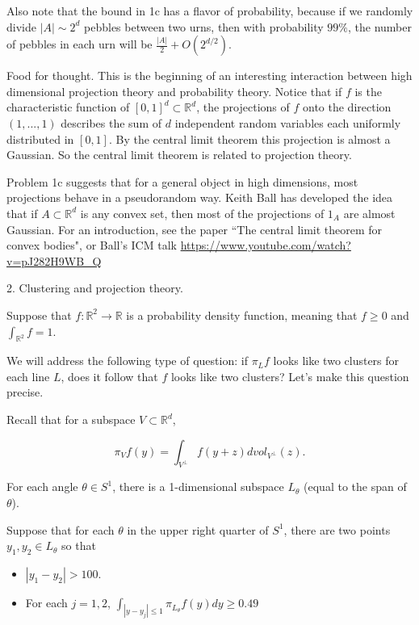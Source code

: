 \documentclass{amsart}
\newcommand{\RR}{\mathbb{R}}
\begin{document}
Also note that the bound in 1c has a flavor of probability,  because if we randomly divide $|A| \sim 2^d$ pebbles between two urns, then with probability $99 \%$,  the number of pebbles in each urn will be $\frac{|A|}{2} + O(2^{d/2})$.

\vskip10pt

Food for thought.  This is the beginning of an interesting interaction between high dimensional projection theory and probability theory.   Notice that if $f$ is the characteristic function of $[0,1]^d \subset \RR^d$,  the projections of $f$ onto the direction $(1,..., 1)$ describes the sum of $d$ independent random variables each uniformly distributed in $[0,1]$.   By the central limit theorem this projection is almost a Gaussian.   So the central limit theorem is related to projection theory. 

Problem 1c suggests that for a general object in high dimensions, most projections behave in a pseudorandom way.    Keith Ball has developed the idea that if $A \subset \RR^d$ is any convex set,  then most of the projections of $1_A$ are almost Gaussian.   For an introduction, see the paper ``The central limit theorem for convex bodies",  or Ball's ICM talk \url{https://www.youtube.com/watch?v=pJ282H9WB_Q}

\vskip10pt

2.  Clustering and projection theory.

Suppose that $f: \RR^2 \rightarrow \RR$ is a probability density function, meaning that $f \ge 0$ and $\int_{\RR^2} f = 1$. 

We will address the following type of question:  if $\pi_L f$ looks like two clusters for each line $L$,  does it follow that $f$ looks like two clusters?  Let's make this question precise.

Recall that for a subspace $V \subset \RR^d$, 

$$ \pi_V f(y) = \int_{V^\perp} f(y + z) dvol_{V^\perp}(z). $$

For each angle $\theta \in S^1$, there is a 1-dimensional subspace $L_\theta$ (equal to the span of $\theta$).  

Suppose that for each $\theta$ in the upper right quarter of $S^1$,  there are two points $y_1, y_2 \in L_\theta$ so that

\begin{itemize}

\item $| y_1 - y_2| > 100$.

\item For each $j = 1,2$,  $\int_{|y - y_j| \le 1} \pi_{L_\theta} f(y) dy \ge 0.49$

\end{itemize}
\end{document}
